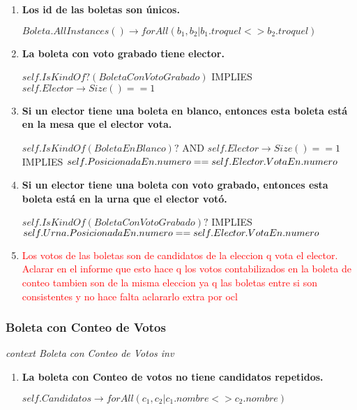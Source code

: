 \begin{enumerate}

\item \textbf{Los id de las boletas son únicos.}

$Boleta.AllInstances() \rightarrow forAll(b_1, b_2 | b_1.troquel <> b_2.troquel)$

\item \textbf{La boleta con voto grabado tiene elector.}

$self.IsKindOf?(BoletaConVotoGrabado)$  IMPLIES  $self.Elector \rightarrow Size() == 1 $

\item \textbf{Si un elector tiene una boleta en blanco, entonces esta boleta está en la mesa que el elector vota.}

$self.IsKindOf(BoletaEnBlanco)?$ AND $self.Elector \rightarrow Size() == 1 $ IMPLIES $\\
self.PosicionadaEn.numero == self.Elector.VotaEn.numero$

\item \textbf{Si un elector tiene una boleta con voto grabado, entonces esta boleta está en la urna que el elector vot\'o.}

$self.IsKindOf(BoletaConVotoGrabado)? $  IMPLIES  $\\
self.Urna.PosicionadaEn.numero == self.Elector.VotaEn.numero$

\item \textcolor{red}{Los votos de las boletas son de candidatos de la eleccion q vota el elector. Aclarar en el informe que esto hace q los votos contabilizados en la boleta de conteo tambien son de la misma eleccion ya q las boletas entre si son consistentes y no hace falta aclararlo extra por ocl}

\end{enumerate}

\subsubsection*{Boleta con Conteo de Votos}

\textit{context Boleta con Conteo de Votos
inv}

\begin{enumerate}
\item \textbf{La boleta con Conteo de votos no tiene candidatos repetidos.}

$self.Candidatos \rightarrow forAll(c_1, c_2| c_1.nombre <> c_2.nombre)$

\end{enumerate}
